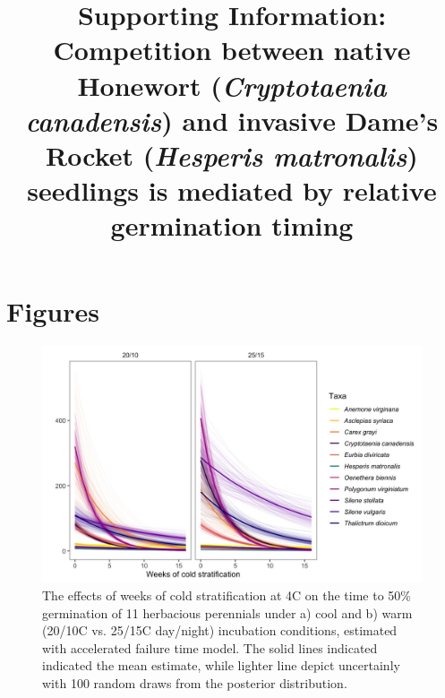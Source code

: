 \documentclass{article}\usepackage[]{graphicx}\usepackage[]{color}
\title{Supporting Information: Competition between native Honewort (\textit{Cryptotaenia canadensis}) and invasive Dame's Rocket (\textit{Hesperis matronalis}) seedlings is mediated by relative germination timing}
\begin{document}
\maketitle
\section{Figures}
\begin{figure}[h!]
    \centering
\includegraphics[width=\textwidth]{..//figure/AFTall.jpeg}
   \caption{The effects of weeks of cold stratification at 4\degree C on the time to 50\% germination of 11 herbacious perennials under a) cool and b) warm (20/10\degree C vs. 25/15\degree C day/night) incubation conditions, estimated with accelerated failure time model. The solid lines indicated indicated the mean estimate, while lighter line depict uncertainly with 100 random draws from the posterior distribution.} 
   \label{fig:AFTall}
\end{figure}
\end{document}
